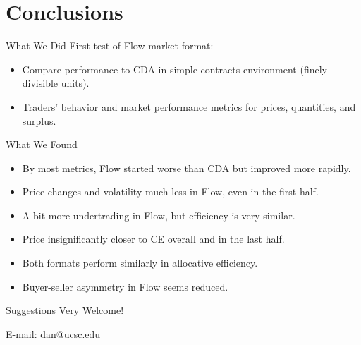 \documentclass[10pt]{beamer}
\begin{document}


\section{Conclusions}

\begin{frame}{What We Did}
First test of Flow market format:
\begin{itemize}
\item Compare performance to CDA in simple contracts environment (finely divisible units). %
\item Traders' behavior and market performance metrics for prices, quantities, and surplus. 
   
    \end{itemize} 
\end{frame}

\begin{frame}{What We Found}
\begin{itemize}
\item By most metrics, Flow started worse than CDA but improved more rapidly.
\item Price changes and volatility much less in Flow, even in the first half.  %
\item A bit more undertrading in Flow, but efficiency is very similar.
\item Price insignificantly closer to CE overall and in the last half. %
\item Both formats perform similarly in allocative efficiency. %
\item Buyer-seller asymmetry in Flow seems reduced.%
    \end{itemize} 

\vspace{.4in}

\begin{center}
{\huge Suggestions Very Welcome!}

E-mail: \url{dan@ucsc.edu}
    
\end{center}
\end{frame}





\end{document}
